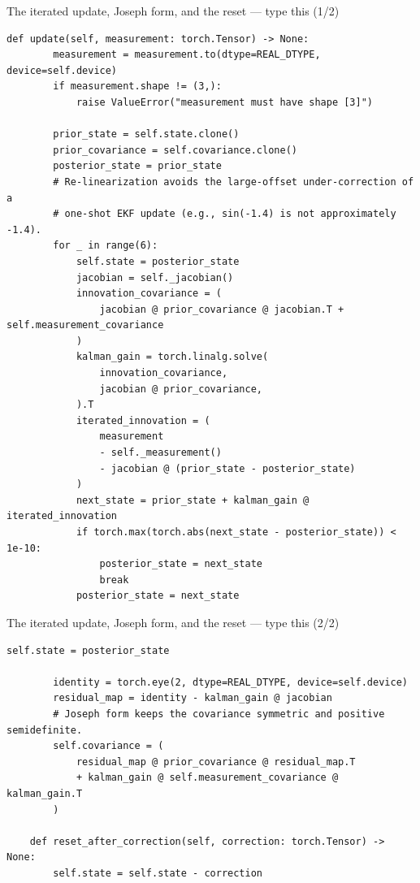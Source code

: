 \documentclass[10pt]{beamer}
\begin{document}
\begin{frame}[fragile]{The iterated update, Joseph form, and the reset --- type this (1/2)}
\begin{lstlisting}[basicstyle=\ttfamily\tiny]
    def update(self, measurement: torch.Tensor) -> None:
        measurement = measurement.to(dtype=REAL_DTYPE, device=self.device)
        if measurement.shape != (3,):
            raise ValueError("measurement must have shape [3]")

        prior_state = self.state.clone()
        prior_covariance = self.covariance.clone()
        posterior_state = prior_state
        # Re-linearization avoids the large-offset under-correction of a
        # one-shot EKF update (e.g., sin(-1.4) is not approximately -1.4).
        for _ in range(6):
            self.state = posterior_state
            jacobian = self._jacobian()
            innovation_covariance = (
                jacobian @ prior_covariance @ jacobian.T + self.measurement_covariance
            )
            kalman_gain = torch.linalg.solve(
                innovation_covariance,
                jacobian @ prior_covariance,
            ).T
            iterated_innovation = (
                measurement
                - self._measurement()
                - jacobian @ (prior_state - posterior_state)
            )
            next_state = prior_state + kalman_gain @ iterated_innovation
            if torch.max(torch.abs(next_state - posterior_state)) < 1e-10:
                posterior_state = next_state
                break
            posterior_state = next_state
\end{lstlisting}
\end{frame}

\begin{frame}[fragile]{The iterated update, Joseph form, and the reset --- type this (2/2)}
\begin{lstlisting}[basicstyle=\ttfamily\tiny]
        self.state = posterior_state

        identity = torch.eye(2, dtype=REAL_DTYPE, device=self.device)
        residual_map = identity - kalman_gain @ jacobian
        # Joseph form keeps the covariance symmetric and positive semidefinite.
        self.covariance = (
            residual_map @ prior_covariance @ residual_map.T
            + kalman_gain @ self.measurement_covariance @ kalman_gain.T
        )

    def reset_after_correction(self, correction: torch.Tensor) -> None:
        self.state = self.state - correction
\end{lstlisting}
\end{frame}
\end{document}

